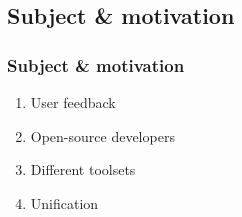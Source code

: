 \subsection{Subject \& motivation}
\begin{frame}\frametitle{Subject \& motivation}
    \begin{enumerate}
        \item User feedback
        \item Open-source developers
        \item Different toolsets
        \item Unification
    \end{enumerate}
\end{frame}


